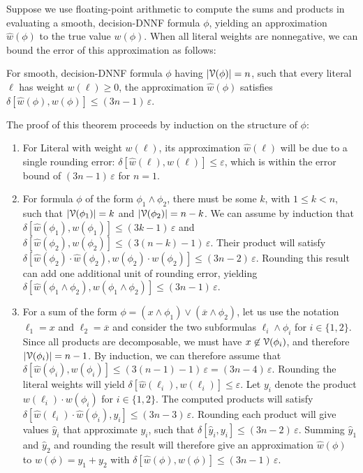 \documentclass[letterpaper,USenglish,cleveref, autoref, thm-restate]{lipics-v2021}
\newcommand{\obar}[1]{\overline{#1}}
\newcommand{\lit}{\ell}
\newcommand{\approximate}[1]{\hat{#1}}
\newcommand{\approxy}{\approximate{y}}
\newcommand{\approxw}{\approximate{w}}
\newcommand{\aerror}{\delta}
\newcommand{\roundepsilon}{\varepsilon}
\newcommand{\dependencyset}{{\cal V}}
\begin{document}
Suppose we use floating-point arithmetic to compute the sums and products in evaluating a smooth, decision-DNNF formula $\phi$, yielding
an approximation $\approxw(\phi)$ to the true value $w(\phi)$.  When all literal weights are nonnegative, we can bound the error of this approximation as follows:
\begin{theorem}
  For smooth, decision-DNNF formula $\phi$ having $|\dependencyset(\phi)| = n$, such that every literal $\lit$ has weight $w(\lit) \geq 0$,
the approximation $\approxw(\phi)$ satisfies
  $\aerror[\approxw(\phi), w(\phi)] \leq (3n-1)\,\roundepsilon$.
  \label{thm:approx:pos}
\end{theorem}

The proof of this theorem proceeds by induction on the structure of $\phi$:
\begin{enumerate}
\item For Literal with weight $w(\lit)$, its approximation $\approxw(\lit)$ will be due to a single rounding error:
$\aerror[\approxw(\lit), w(\lit)] \leq \roundepsilon$, which is within the error bound of $(3n-1)\,\roundepsilon$ for $n=1$.
\item For formula $\phi$ of the form $\phi_1 \land \phi_2$, there must be some $k$, with $1 \leq k < n$, such that $|\dependencyset(\phi_1)| = k$
  and $|\dependencyset(\phi_2)| = n-k$.  We can assume by induction that 
$\aerror[\approxw(\phi_1), w(\phi_1)] \leq (3 k-1) \,\roundepsilon$
  and $\aerror[\approxw(\phi_2), w(\phi_2)] \leq (3 (n-k)-1) \,\roundepsilon$.  Their product
  will satisfy 
  $\aerror[\approxw(\phi_2) \cdot \approxw(\phi_2), w(\phi_2) \cdot w(\phi_2)] \leq (3 n -2) \,\roundepsilon$.
  Rounding this result can add one additional unit of rounding error, yielding
$\aerror[\approxw(\phi_1 \land \phi_2), w(\phi_1 \land \phi_2)] \leq (3 n -1) \,\roundepsilon$.
\item For a sum of the form
  $\phi = (x \land \phi_1) \lor (\obar{x} \land \phi_2)$, let us use the notation $\lit_1 = x$ and $\lit_2 = \obar{x}$
  and consider the two subformulas $\lit_i \land \phi_i$ for $i \in \{1,2\}$.
  Since all products are decomposable, we must have $x \not \in \dependencyset(\phi_i)$,
  and therefore $|\dependencyset(\phi_i)| = n-1$.
  By induction, we can therefore assume that
  $\aerror[\approxw(\phi_i), w(\phi_i)] \leq (3(n-1)-1) \,\roundepsilon = (3n-4)\,\roundepsilon$.  Rounding the literal weights will yield
  $\aerror[\approxw(\lit_i), w(\lit_i)] \leq \roundepsilon$.  Let $y_i$ denote the product $w(\lit_i) \cdot w(\phi_i)$ for $i \in \{1,2\}$.
  The computed products will satisfy
  $\aerror[\approxw(\lit_i) \cdot \approxw(\phi_i), y_i] \leq (3n-3) \,\roundepsilon$.
  Rounding each product will give values $\approxy_i$ that approximate $y_i$, such that
  $\aerror[\approxy_i, y_i] \leq (3n-2) \,\roundepsilon$.  Summing $\approxy_1$ and $\approxy_2$ and rounding the result will therefore give
  an approximation $\approxw(\phi)$ to $w(\phi) = y_1 + y_2$ with
$\aerror[\approxw(\phi), w(\phi)] \leq (3n-1)\,\roundepsilon$.  
\end{enumerate}
\end{document}
